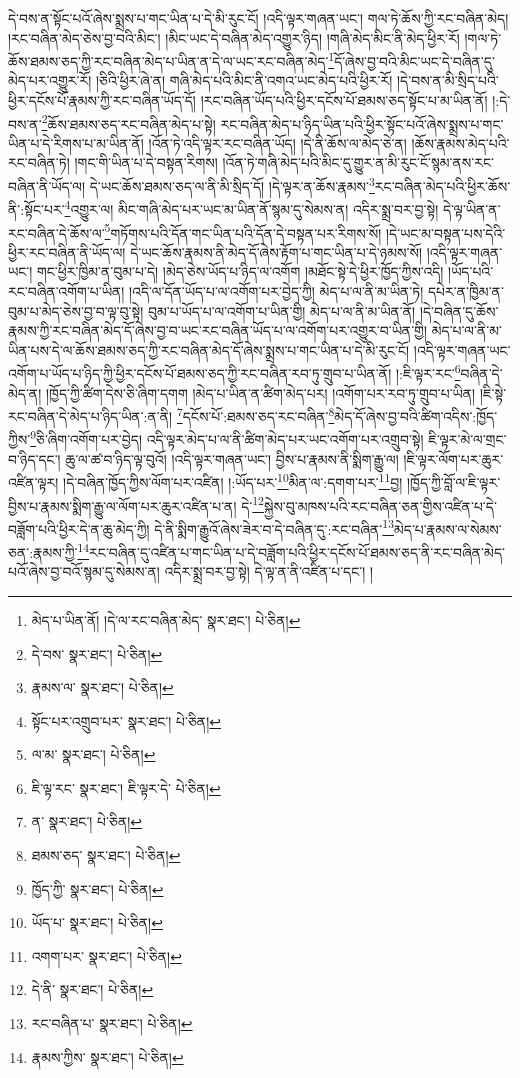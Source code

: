 དེ་བས་ན་སྟོང་པའོ་ཞེས་སྨྲས་པ་གང་ཡིན་པ་དེ་མི་རུང་ངོ། །འདི་ལྟར་གཞན་ཡང་། གལ་ཏེ་ཆོས་ཀྱི་རང་བཞིན་མེད། །རང་བཞིན་མེད་ཅེས་བྱ་བའི་མིང་། །མིང་ཡང་དེ་བཞིན་མེད་འགྱུར་ཉིད། །གཞི་མེད་མིང་ནི་མེད་ཕྱིར་རོ། །གལ་ཏེ་ཆོས་ཐམས་ཅད་ཀྱི་རང་བཞིན་མེད་པ་ཡིན་ན་དེ་ལ་ཡང་རང་བཞིན་མེད་\footnote{མེད་པ་ཡིན་ནོ། །དེ་ལ་རང་བཞིན་མེད་  སྣར་ཐང་།  པེ་ཅིན། }དོ་ཞེས་བྱ་བའི་མིང་ཡང་དེ་བཞིན་དུ་མེད་པར་འགྱུར་རོ། །ཅིའི་ཕྱིར་ཞེ་ན། གཞི་མེད་པའི་མིང་ནི་འགའ་ཡང་མེད་པའི་ཕྱིར་རོ། །དེ་བས་ན་མི་སྲིད་པའི་ཕྱིར་དངོས་པོ་རྣམས་ཀྱི་རང་བཞིན་ཡོད་དོ། །རང་བཞིན་ཡོད་པའི་ཕྱིར་དངོས་པོ་ཐམས་ཅད་སྟོང་པ་མ་ཡིན་ནོ། །:དེ་བས་ན་\footnote{དེ་བས་  སྣར་ཐང་།  པེ་ཅིན། }ཆོས་ཐམས་ཅད་རང་བཞིན་མེད་པ་སྟེ། རང་བཞིན་མེད་པ་ཉིད་ཡིན་པའི་ཕྱིར་སྟོང་པའོ་ཞེས་སྨྲས་པ་གང་ཡིན་པ་དེ་རིགས་པ་མ་ཡིན་ནོ། །འོན་ཏེ་འདི་ལྟར་རང་བཞིན་ཡོད། །དེ་ནི་ཆོས་ལ་མེད་ཅེ་ན། །ཆོས་རྣམས་མེད་པའི་རང་བཞིན་ཏེ། །གང་གི་ཡིན་པ་དེ་བསྟན་རིགས། །འོན་ཏེ་གཞི་མེད་པའི་མིང་དུ་གྱུར་ན་མི་རུང་ངོ་སྙམ་ནས་རང་བཞིན་ནི་ཡོད་ལ། དེ་ཡང་ཆོས་ཐམས་ཅད་ལ་ནི་མི་སྲིད་དོ། །དེ་ལྟར་ན་ཆོས་རྣམས་\footnote{རྣམས་ལ་  སྣར་ཐང་།  པེ་ཅིན། }རང་བཞིན་མེད་པའི་ཕྱིར་ཆོས་ནི་:སྟོང་པར་\footnote{སྟོང་པར་འགྲུབ་པར་  སྣར་ཐང་།  པེ་ཅིན། }འགྱུར་ལ། མིང་གཞི་མེད་པར་ཡང་མ་ཡིན་ནོ་སྙམ་དུ་སེམས་ན། འདིར་སྨྲ་བར་བྱ་སྟེ། དེ་ལྟ་ཡིན་ན་རང་བཞིན་དེ་ཆོས་ལ་\footnote{ལ་མ་  སྣར་ཐང་།  པེ་ཅིན། }གཏོགས་པའི་དོན་གང་ཡིན་པའི་དོན་དེ་བསྟན་པར་རིགས་སོ། །དེ་ཡང་མ་བསྟན་པས་དེའི་ཕྱིར་རང་བཞིན་ནི་ཡོད་ལ། དེ་ཡང་ཆོས་རྣམས་ནི་མེད་དོ་ཞེས་རྟོག་པ་གང་ཡིན་པ་དེ་ཉམས་སོ། །འདི་ལྟར་གཞན་ཡང་། གང་ཕྱིར་ཁྱིམ་ན་བུམ་པ་དེ། །མེད་ཅེས་ཡོད་པ་ཉིད་ལ་འགོག །མཐོང་སྟེ་དེ་ཕྱིར་ཁྱོད་ཀྱིས་འདི། །ཡོད་པའི་རང་བཞིན་འགོག་པ་ཡིན། །འདི་ལ་དོན་ཡོད་པ་ལ་འགོག་པར་བྱེད་ཀྱི། མེད་པ་ལ་ནི་མ་ཡིན་ཏེ། དཔེར་ན་ཁྱིམ་ན་བུམ་པ་མེད་ཅེས་བྱ་བ་ལྟ་བུ་སྟེ། བུམ་པ་ཡོད་པ་ལ་འགོག་པ་ཡིན་གྱི། མེད་པ་ལ་ནི་མ་ཡིན་ནོ། །དེ་བཞིན་དུ་ཆོས་རྣམས་ཀྱི་རང་བཞིན་མེད་དོ་ཞེས་བྱ་བ་ཡང་རང་བཞིན་ཡོད་པ་ལ་འགོག་པར་འགྱུར་བ་ཡིན་གྱི། མེད་པ་ལ་ནི་མ་ཡིན་པས་དེ་ལ་ཆོས་ཐམས་ཅད་ཀྱི་རང་བཞིན་མེད་དོ་ཞེས་སྨྲས་པ་གང་ཡིན་པ་དེ་མི་རུང་ངོ། །འདི་ལྟར་གཞན་ཡང་འགོག་པ་ཡོད་པ་ཉིད་ཀྱི་ཕྱིར་དངོས་པོ་ཐམས་ཅད་ཀྱི་རང་བཞིན་རབ་ཏུ་གྲུབ་པ་ཡིན་ནོ། །:ཇི་ལྟར་རང་\footnote{ཇི་ལྟ་རང་  སྣར་ཐང་། ཇི་ལྟར་དེ་  པེ་ཅིན། }བཞིན་དེ་མེད་ན། །ཁྱོད་ཀྱི་ཚིག་དེས་ཅི་ཞིག་དགག །མེད་པ་ཡིན་ན་ཚིག་མེད་པར། །འགོག་པར་རབ་ཏུ་གྲུབ་པ་ཡིན། །ཇི་སྟེ་རང་བཞིན་དེ་མེད་པ་ཉིད་ཡིན་:ན་ནི། \footnote{ན་  སྣར་ཐང་།  པེ་ཅིན། }དངོས་པོ་:ཐམས་ཅད་རང་བཞིན་\footnote{ཐམས་ཅད་  སྣར་ཐང་།  པེ་ཅིན། }མེད་དོ་ཞེས་བྱ་བའི་ཚིག་འདིས་:ཁྱོད་ཀྱིས་\footnote{ཁྱོད་ཀྱི་  སྣར་ཐང་།  པེ་ཅིན། }ཅི་ཞིག་འགོག་པར་བྱེད། འདི་ལྟར་མེད་པ་ལ་ནི་ཚིག་མེད་པར་ཡང་འགོག་པར་འགྲུབ་སྟེ། ཇི་ལྟར་མེ་ལ་གྲང་བ་ཉིད་དང་། ཆུ་ལ་ཚ་བ་ཉིད་ལྟ་བུའོ། །འདི་ལྟར་གཞན་ཡང་། བྱིས་པ་རྣམས་ནི་སྨིག་རྒྱུ་ལ། །ཇི་ལྟར་ལོག་པར་ཆུར་འཛིན་ལྟར། །དེ་བཞིན་ཁྱོད་ཀྱིས་ལོག་པར་འཛིན། །:ཡོད་པར་\footnote{ཡོད་པ་  སྣར་ཐང་།  པེ་ཅིན། }མིན་ལ་:དགག་པར་\footnote{འགག་པར་  སྣར་ཐང་།  པེ་ཅིན། }བྱ། །ཁྱོད་ཀྱི་བློ་ལ་ཇི་ལྟར་བྱིས་པ་རྣམས་སྨིག་རྒྱུ་ལ་ལོག་པར་ཆུར་འཛིན་པ་ན། དེ་\footnote{དེ་ནི་  སྣར་ཐང་།  པེ་ཅིན། }སྐྱེས་བུ་མཁས་པའི་རང་བཞིན་ཅན་གྱིས་འཛིན་པ་དེ་བཟློག་པའི་ཕྱིར་དེ་ན་ཆུ་མེད་ཀྱི། དེ་ནི་སྨིག་རྒྱུའོ་ཞེས་ཟེར་བ་དེ་བཞིན་དུ་:རང་བཞིན་\footnote{རང་བཞིན་པ་  སྣར་ཐང་།  པེ་ཅིན། }མེད་པ་རྣམས་ལ་སེམས་ཅན་:རྣམས་ཀྱི་\footnote{རྣམས་ཀྱིས་  སྣར་ཐང་།  པེ་ཅིན། }རང་བཞིན་དུ་འཛིན་པ་གང་ཡིན་པ་དེ་བཟློག་པའི་ཕྱིར་དངོས་པོ་ཐམས་ཅད་ནི་རང་བཞིན་མེད་པའོ་ཞེས་བྱ་བའོ་སྙམ་དུ་སེམས་ན། འདིར་སྨྲ་བར་བྱ་སྟེ། དེ་ལྟ་ན་ནི་འཛིན་པ་དང་། །
